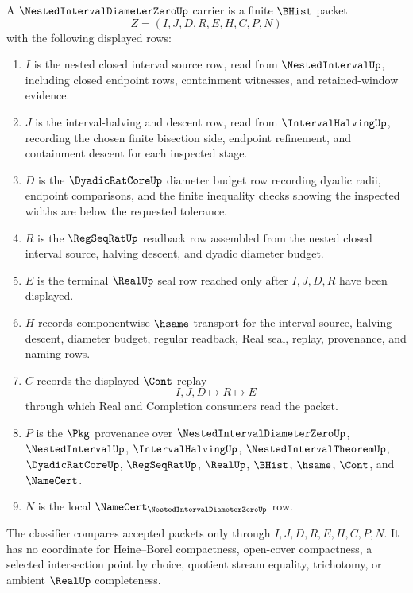 \begin{definition}
\label{def:nested-interval-diameter-zero-carrier}
A $\NestedIntervalDiameterZeroUp$ carrier is a finite $\BHist$ packet
$$
Z=(I,J,D,R,E,H,C,P,N)
$$
with the following displayed rows:
\begin{enumerate}
\item $I$ is the nested closed interval source row, read from $\NestedIntervalUp$, including closed endpoint rows, containment witnesses, and retained-window evidence.
\item $J$ is the interval-halving and descent row, read from $\IntervalHalvingUp$, recording the chosen finite bisection side, endpoint refinement, and containment descent for each inspected stage.
\item $D$ is the $\DyadicRatCoreUp$ diameter budget row recording dyadic radii, endpoint comparisons, and the finite inequality checks showing the inspected widths are below the requested tolerance.
\item $R$ is the $\RegSeqRatUp$ readback row assembled from the nested closed interval source, halving descent, and dyadic diameter budget.
\item $E$ is the terminal $\RealUp$ seal row reached only after $I,J,D,R$ have been displayed.
\item $H$ records componentwise $\hsame$ transport for the interval source, halving descent, diameter budget, regular readback, Real seal, replay, provenance, and naming rows.
\item $C$ records the displayed $\Cont$ replay
$$
I,J,D \longmapsto R \longmapsto E
$$
through which Real and Completion consumers read the packet.
\item $P$ is the $\Pkg$ provenance over $\NestedIntervalDiameterZeroUp$, $\NestedIntervalUp$, $\IntervalHalvingUp$, $\NestedIntervalTheoremUp$, $\DyadicRatCoreUp$, $\RegSeqRatUp$, $\RealUp$, $\BHist$, $\hsame$, $\Cont$, and $\NameCert$.
\item $N$ is the local $\NameCert_{\NestedIntervalDiameterZeroUp}$ row.
\end{enumerate}
The classifier compares accepted packets only through $I,J,D,R,E,H,C,P,N$. It has no coordinate for Heine--Borel compactness, open-cover compactness, a selected intersection point by choice, quotient stream equality, trichotomy, or ambient $\RealUp$ completeness.
\end{definition}

